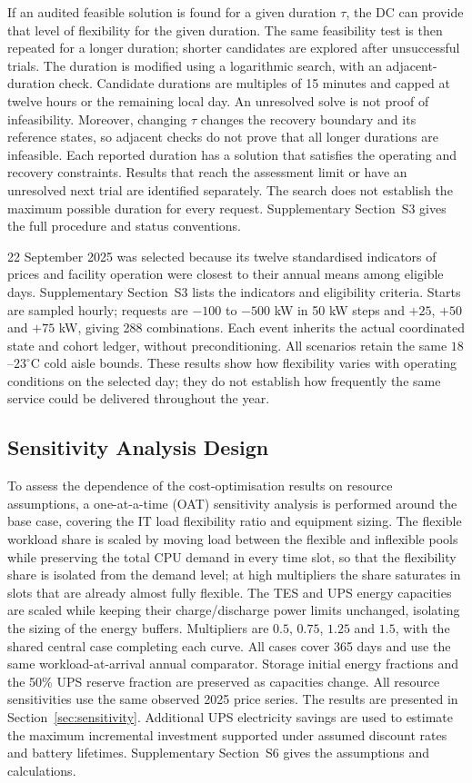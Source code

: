 \documentclass[lettersize,journal]{IEEEtran}
\newcommand{\rev}[1]{#1}
\begin{document}
If an audited feasible solution is found for a given duration $\tau$, the DC can provide that level of flexibility for the given duration. The same feasibility test is then repeated for a longer duration; shorter candidates are explored after unsuccessful trials. The duration is modified using a logarithmic search, with an adjacent-duration check. Candidate durations are multiples of 15 minutes and capped at twelve hours or the remaining local day. An unresolved solve is not proof of infeasibility. Moreover, changing $\tau$ changes the recovery boundary and its reference states, so adjacent checks do not prove that all longer durations are infeasible. Each reported duration has a solution that satisfies the operating and recovery constraints. Results that reach the assessment limit or have an unresolved next trial are identified separately. The search does not establish the maximum possible duration for every request. Supplementary Section~S3 gives the full procedure and status conventions.

22 September 2025 was selected because its twelve standardised indicators of prices and facility operation were closest to their annual means among eligible days. Supplementary Section~S3 lists the indicators and eligibility criteria. Starts are sampled hourly; requests are $-100$ to $-500$ kW in 50 kW steps and $+25$, $+50$ and $+75$ kW, giving 288 combinations. Each event inherits the actual coordinated state and cohort ledger, without preconditioning. All scenarios retain the same $18$--$23^\circ$C cold aisle bounds. These results show how flexibility varies with operating conditions on the selected day; they do not establish how frequently the same service could be delivered throughout the year.

\subsection{\rev{Sensitivity Analysis Design}}\label{sec:sensitivity-design}
\rev{To assess the dependence of the cost-optimisation results on resource assumptions, a one-at-a-time (OAT) sensitivity analysis is performed around the base case, covering the IT load flexibility ratio and equipment sizing. The flexible workload share is scaled by moving load between the flexible and inflexible pools while preserving the total CPU demand in every time slot, so that the flexibility share is isolated from the demand level; at high multipliers the share saturates in slots that are already almost fully flexible. The TES and UPS energy capacities are scaled while keeping their charge/discharge power limits unchanged, isolating the sizing of the energy buffers. Multipliers are $0.5$, $0.75$, $1.25$ and $1.5$, with the shared central case completing each curve. All cases cover 365 days and use the same workload-at-arrival annual comparator. Storage initial energy fractions and the 50\% UPS reserve fraction are preserved as capacities change. All resource sensitivities use the same observed 2025 price series. The results are presented in Section~\ref{sec:sensitivity}.} Additional UPS electricity savings are used to estimate the maximum incremental investment supported under assumed discount rates and battery lifetimes. Supplementary Section~S6 gives the assumptions and calculations.
\end{document}
